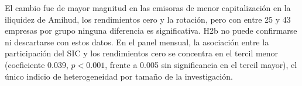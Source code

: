 El cambio fue de mayor magnitud en las emisoras de menor capitalización en la iliquidez de Amihud, los rendimientos cero y la rotación, pero con entre 25 y 43 empresas por grupo ninguna diferencia es significativa. H2b no puede confirmarse ni descartarse con estos datos. En el panel mensual, la asociación entre la participación del SIC y los rendimientos cero se concentra en el tercil menor (coeficiente 0.039, $p<0.001$, frente a 0.005 sin significancia en el tercil mayor), el único indicio de heterogeneidad por tamaño de la investigación.




